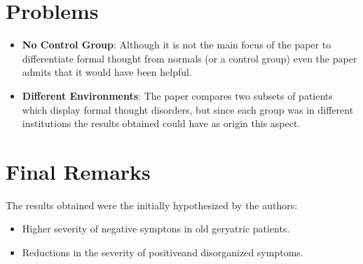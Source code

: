 \documentclass{Paper_Summary}
\begin{document}
\section{Problems}
    \begin{itemize}
        \item \textbf{No Control Group}: Although it is not the main focus of the paper to differentiate formal thought from normals (or a control group) even the paper admits that it would have been helpful.
        \item \textbf{Different Environments}: The paper compares two subsets of patients which display formal thought disorders, but since each group was in different institutions the results obtained could have as origin this aspect.
    \end{itemize}


\section{Final Remarks}
    
    The results obtained were the initially hypothesized by the authors:
    \begin{itemize}
        \item Higher severity of negative symptons in old geryatric patients.
        \item Reductions in the severity of positiveand disorganized symptoms.
    \end{itemize}
\end{document}
